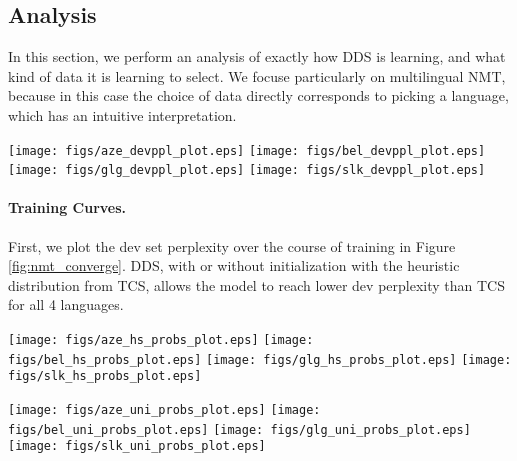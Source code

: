 \subsection{\label{sec:analysis} Analysis}
In this section, we perform an analysis of exactly how DDS is learning, and what kind of data it is learning to select.
We focuse particularly on multilingual NMT, because in this case the choice of data directly corresponds to picking a language, which has an intuitive interpretation.
\begin{center}
  \texttt{[image: figs/aze\_devppl\_plot.eps]}
  \texttt{[image: figs/bel\_devppl\_plot.eps]}
  \texttt{[image: figs/glg\_devppl\_plot.eps]}
  \texttt{[image: figs/slk\_devppl\_plot.eps]}
\end{center}
\paragraph{Training Curves.} First, we plot the dev set perplexity over the course of training in Figure \ref{fig:nmt_converge}.
DDS, with or without initialization with the heuristic distribution from TCS, allows the model to reach lower dev perplexity than TCS for all 4 languages.

\begin{center}
  \texttt{[image: figs/aze\_hs\_probs\_plot.eps]}
  \texttt{[image: figs/bel\_hs\_probs\_plot.eps]}
  \texttt{[image: figs/glg\_hs\_probs\_plot.eps]}
  \texttt{[image: figs/slk\_hs\_probs\_plot.eps]}
\end{center}

\begin{center}
  \texttt{[image: figs/aze\_uni\_probs\_plot.eps]}
  \texttt{[image: figs/bel\_uni\_probs\_plot.eps]}
  \texttt{[image: figs/glg\_uni\_probs\_plot.eps]}
  \texttt{[image: figs/slk\_uni\_probs\_plot.eps]}
\end{center}
